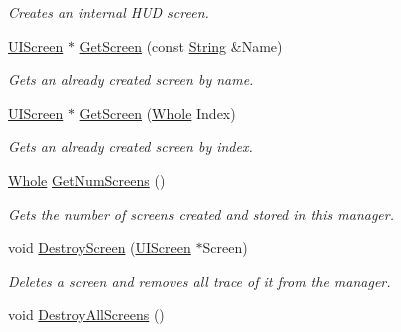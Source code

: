 \begin{DoxyCompactItemize}
\begin{DoxyCompactList}\small\item\em Creates an internal HUD screen. \item\end{DoxyCompactList}\item 
\hyperlink{classphys_1_1UIScreen}{UIScreen} $\ast$ \hyperlink{classphys_1_1UIManager_a8cd693c7ec9c458fcc4169eea0d7b4db}{GetScreen} (const \hyperlink{namespacephys_aa03900411993de7fbfec4789bc1d392e}{String} \&Name)
\begin{DoxyCompactList}\small\item\em Gets an already created screen by name. \item\end{DoxyCompactList}\item 
\hyperlink{classphys_1_1UIScreen}{UIScreen} $\ast$ \hyperlink{classphys_1_1UIManager_a6083b86b2e240cc316e8ca87479d15a8}{GetScreen} (\hyperlink{namespacephys_a460f6bc24c8dd347b05e0366ae34f34a}{Whole} Index)
\begin{DoxyCompactList}\small\item\em Gets an already created screen by index. \item\end{DoxyCompactList}\item 
\hyperlink{namespacephys_a460f6bc24c8dd347b05e0366ae34f34a}{Whole} \hyperlink{classphys_1_1UIManager_a3bd28c361f6fc79a182ebd3ec0a26ec7}{GetNumScreens} ()
\begin{DoxyCompactList}\small\item\em Gets the number of screens created and stored in this manager. \item\end{DoxyCompactList}\item 
void \hyperlink{classphys_1_1UIManager_a5afab78f58a6531fc18771f5a4eeccf8}{DestroyScreen} (\hyperlink{classphys_1_1UIScreen}{UIScreen} $\ast$Screen)
\begin{DoxyCompactList}\small\item\em Deletes a screen and removes all trace of it from the manager. \item\end{DoxyCompactList}\item 
\hypertarget{classphys_1_1UIManager_a97555e02aad6c85cac6bf67fbe074cd1}{
void \hyperlink{classphys_1_1UIManager_a97555e02aad6c85cac6bf67fbe074cd1}{DestroyAllScreens} ()}
\label{d5/dc5/classphys_1_1UIManager_a97555e02aad6c85cac6bf67fbe074cd1}


\end{DoxyCompactItemize}

